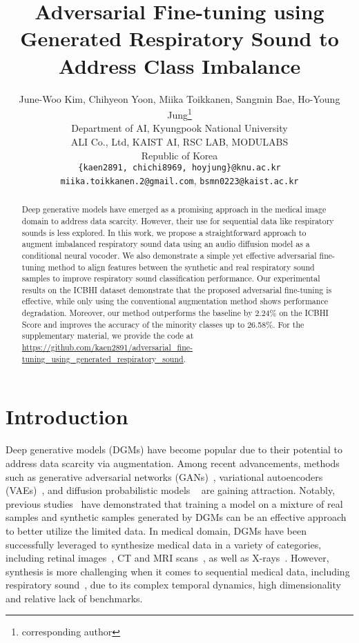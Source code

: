 \documentclass{article}
\title{Adversarial Fine-tuning using Generated Respiratory Sound to Address Class Imbalance}
\author{June-Woo Kim, Chihyeon Yoon, Miika Toikkanen, Sangmin Bae, Ho-Young Jung\thanks{corresponding author}\\
Department of AI, Kyungpook National University\\ 
  ALI Co., Ltd, KAIST AI, RSC LAB, MODULABS\\
  Republic of Korea\\
  \texttt{\{kaen2891, chichi8969, hoyjung\}@knu.ac.kr}\\
  \texttt{miika.toikkanen.2@gmail.com}, \texttt{bsmn0223@kaist.ac.kr}
}
\begin{document}
\maketitle


\begin{abstract}
Deep generative models have emerged as a promising approach in the medical image domain to address data scarcity. However, their use for sequential data like respiratory sounds is less explored.
In this work, we propose a straightforward approach to augment imbalanced respiratory sound data using an audio diffusion model as a conditional neural vocoder. 
We also demonstrate a simple yet effective adversarial fine-tuning method to align features between the synthetic and real respiratory sound samples to improve respiratory sound classification performance.
Our experimental results on the ICBHI dataset demonstrate that the proposed adversarial fine-tuning is effective, while only using the conventional augmentation method shows performance degradation.
Moreover, our method outperforms the baseline by 2.24\% on the ICBHI Score and improves the accuracy of the minority classes up to 26.58\%. For the supplementary material, we provide the code at \url{https://github.com/kaen2891/adversarial_fine-tuning_using_generated_respiratory_sound}.




\end{abstract}






\section{Introduction}
Deep generative models (DGMs) have become popular due to their potential to address data scarcity via augmentation. Among recent advancements, methods such as generative adversarial networks (GANs)~\cite{goodfellow2014generative}, variational autoencoders (VAEs)~\cite{kingma2013auto}, and diffusion probabilistic models ~\cite{ho2020denoising} are gaining attraction.
Notably, previous studies~\cite{antoniou2017data, bowles2018gan} have demonstrated that training a model on a mixture of real samples and synthetic samples generated by DGMs can be an effective approach to better utilize the limited data. In medical domain, DGMs have been successfully leveraged to synthesize medical data in a variety of categories, including retinal images~\cite{costa2017end, iqbal2018generative}, CT and MRI scans~\cite{nie2017medical, shin2018medical, sandfort2019data}, as well as X-rays~\cite{loey2020within, motamed2021data}.
However, synthesis is more challenging when it comes to sequential medical data, including respiratory sound~\cite{kochetov2020generative, jayalakshmy2021conditional, saldanha2022data}, due to its complex temporal dynamics, high dimensionality and relative lack of benchmarks. 
\end{document}
